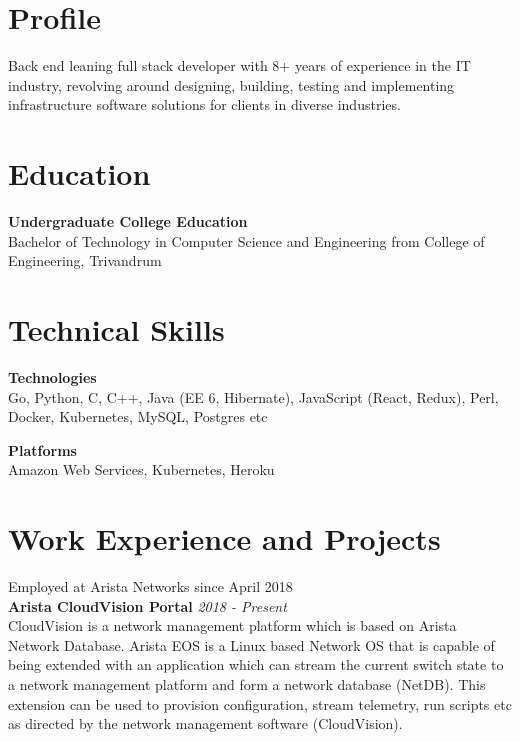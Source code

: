 \documentclass[line,margin]{res}
\begin{document}


\address{jojiantony@yandex.com}
\address{+91 96323 41954}

\begin{resume}

\section{Profile}
Back end leaning full stack developer with 8+ years of experience in the IT industry, revolving around designing, building, testing and implementing infrastructure software solutions for clients in diverse industries.

\section{Education}
{\bf Undergraduate College Education}\\
Bachelor of Technology in Computer Science and Engineering from College of Engineering, Trivandrum\\

\section{Technical Skills}

{\bf Technologies}\\
Go, Python, C, C++, Java (EE 6, Hibernate), JavaScript (React, Redux), Perl, Docker, Kubernetes, MySQL, Postgres etc

{\bf Platforms}\\
Amazon Web Services, Kubernetes, Heroku

\section{Work Experience and Projects}

Employed at Arista Networks since April 2018\\

{\bf Arista CloudVision Portal} \hfill {\it{2018 - Present}}\\

CloudVision is a network management platform which is based on Arista Network Database. Arista EOS is a Linux based Network OS that is capable of being extended with an application which can stream the current switch state to a network management platform and form a network database (NetDB). This extension can be used to provision configuration, stream telemetry, run scripts etc as directed by the network management software (CloudVision). 


\end{resume}
\end{document}
